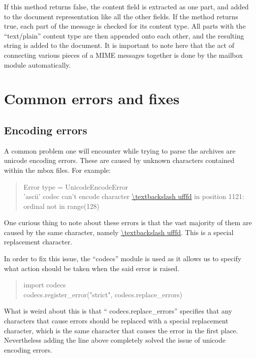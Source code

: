 \documentclass[a4paper,english]{report}
\begin{document}
If this method returns false, the content field is extracted as one part, and added to the document representation like all the other fields.
If the method returns true, each part of the message is checked for its content type. All parts with the “text/plain” content type are then appended onto each other, and the resulting string is added to the document. 
It is important to note here that the act of connecting various pieces of a MIME messages together is done by the mailbox module automatically.

\begin{center}



\end{center}

\section{Common errors and fixes}

\subsection{Encoding errors}

A common problem one will encounter while trying to parse the archives  are unicode encoding errors. These are caused by unknown characters contained within the mbox files.  
For example:\\

\begin{quotation}
Error type = UnicodeEncodeError\\
'ascii' codec can't encode character \url{\textbackslash ufffd} in position 1121: ordinal not in range(128)
\end{quotation}

One curious thing to note about these errors is that the vast majority of them are caused by the same character, namely \url{\textbackslash ufffd}. This is  a special replacement character.

In order to fix this issue, the “codecs” module is used as it allows us to specify what action should be taken when the said error is raised.\\ 
\begin{quotation}
\noindent
import codecs\\
codecs.register\_error("strict", codecs.replace\_errors)\\
\end{quotation}
What is weird about this is that “ codecs.replace\_errors” specifies that any characters that cause errors should be replaced with a special replacement character, which is the same character that causes the error in the first place.\\
Nevertheless adding the line above completely solved the issue of unicode encoding errors.
\end{document}
